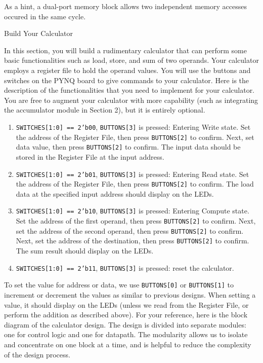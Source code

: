\documentclass[11pt]{article}
\makeatletter
\renewcommand{\section}
{\@startsection {section}{1}{0pt}
 {-2ex}
 {1ex}
 {\bfseries\Large}}
\makeatother
\begin{document}
{\begin{enumerate}
As a hint, a dual-port memory block allows two independent memory accesses occured in the same cycle.
\end{enumerate}

\section{Build Your Calculator}

In this section, you will build a rudimentary calculator that can perform some basic functionalities such as load, store, and sum of two operands. Your calculator employs a register file to hold the operand values. You will use the buttons and switches on the PYNQ board to give commands to your calculator. Here is the description of the functionalities that you need to implement for your calculator. You are free to augment your calculator with more capability (such as integrating the accumulator module in Section 2), but it is entirely optional.

\begin{enumerate}
  \item \texttt{SWITCHES[1:0] == 2'b00}, \texttt{BUTTONS[3]} is pressed: Entering Write state. Set the address of the Register File, then press \texttt{BUTTONS[2]} to confirm. Next, set data value, then press \texttt{BUTTONS[2]} to confirm. The input data should be stored in the Register File at the input address.
  \item \texttt{SWITCHES[1:0] == 2'b01}, \texttt{BUTTONS[3]} is pressed: Entering Read state. Set the address of the Register File, then press \texttt{BUTTONS[2]} to confirm. The load data at the specified input address should display on the LEDs.
  \item \texttt{SWITCHES[1:0] == 2'b10}, \texttt{BUTTONS[3]} is pressed: Entering Compute state. Set the address of the first operand, then press \texttt{BUTTONS[2]} to confirm. Next, set the address of the second operand, then press \texttt{BUTTONS[2]} to confirm. Next, set the address of the destination, then press \texttt{BUTTONS[2]} to confirm. The sum result should display on the LEDs.
  \item \texttt{SWITCHES[1:0] == 2'b11}, \texttt{BUTTONS[3]} is pressed: reset the calculator.
\end{enumerate}

To set the value for address or data, we use \texttt{BUTTONS[0]} or \texttt{BUTTONS[1]} to increment or decrement the values as similar to previous designs. When setting a value, it should display on the LEDs (unless we read from the Register File, or perform the addition as described above). For your reference, here is the block diagram of the calculator design. The design is divided into separate modules: one for control logic and one for datapath. The modularity allows us to isolate and concentrate on one block at a time, and is helpful to reduce the complexity of the design process.

}
\end{document}
